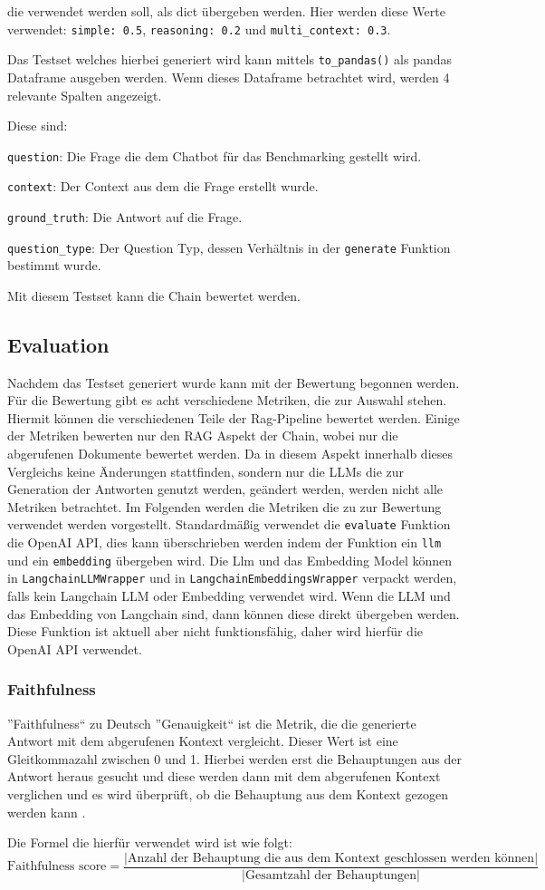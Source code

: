 die verwendet werden soll, als dict übergeben werden. Hier werden diese Werte verwendet: \verb+simple: 0.5+,
\verb+reasoning: 0.2+ und \verb+multi_context: 0.3+.\par
Das Testset welches hierbei generiert wird kann mittels 
\verb+to_pandas()+ als pandas Dataframe ausgeben werden.
Wenn dieses Dataframe betrachtet wird, werden 4 relevante Spalten angezeigt.\par
Diese sind: \par
\verb+question+: Die Frage die dem Chatbot für das Benchmarking gestellt wird. \par
\verb+context+: Der Context aus dem die Frage erstellt wurde. \par
\verb+ground_truth+: Die Antwort auf die Frage. \par
\verb+question_type+: Der Question Typ, dessen Verhältnis in der \verb+generate+ Funktion bestimmt wurde.\par
Mit diesem Testset kann die Chain bewertet werden.

\subsection{Evaluation}
\label{metrics}
Nachdem das Testset generiert wurde kann mit der Bewertung begonnen werden. 
Für die Bewertung gibt es acht verschiedene Metriken, die zur Auswahl stehen. 
Hiermit können die verschiedenen Teile der Rag-Pipeline bewertet werden.
Einige der Metriken bewerten nur den RAG Aspekt der Chain, wobei nur die abgerufenen 
Dokumente bewertet werden. Da in diesem Aspekt innerhalb dieses Vergleichs keine Änderungen stattfinden, sondern
nur die LLMs die zur Generation der Antworten genutzt werden, geändert werden, werden
nicht alle Metriken betrachtet.
Im Folgenden werden die Metriken die zu zur Bewertung verwendet werden vorgestellt.
Standardmäßig verwendet die \verb|evaluate| Funktion die OpenAI API, 
dies kann überschrieben werden indem der Funktion ein \verb|llm| 
und ein \verb|embedding| übergeben wird. Die Llm und das Embedding Model können 
in \verb|LangchainLLMWrapper| und in \verb|LangchainEmbeddingsWrapper| verpackt werden,
falls kein Langchain LLM oder Embedding verwendet wird. Wenn die LLM und das 
Embedding von Langchain sind, dann können diese direkt übergeben werden. 
Diese Funktion ist aktuell aber nicht 
funktionsfähig, daher wird hierfür die OpenAI API verwendet.

\subsubsection{Faithfulness}
''Faithfulness`` zu Deutsch ''Genauigkeit`` ist die Metrik, die die 
generierte Antwort mit dem abgerufenen Kontext vergleicht. Dieser Wert ist 
eine Gleitkommazahl zwischen 0 und 1. Hierbei werden erst die Behauptungen 
aus der Antwort heraus gesucht und diese werden dann mit dem abgerufenen 
Kontext verglichen und es wird überprüft, ob die Behauptung aus dem Kontext 
gezogen werden kann \cite{FaithfulnessRagas}.\par
Die Formel die hierfür verwendet wird ist wie folgt:
\[\text{Faithfulness score}= \frac{|\text{Anzahl der Behauptung die aus dem Kontext geschlossen werden können}|}{|\text{Gesamtzahl der Behauptungen}|}\]

